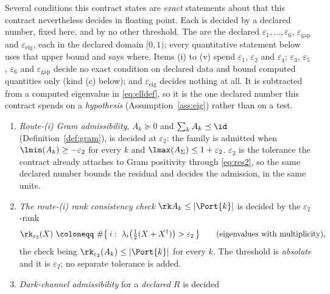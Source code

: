 \begin{definition}
\label{def:tolmap}
Several conditions this contract states are \emph{exact} statements about
 that this contract nevertheless decides in floating point. Each is decided by a declared number, fixed here,
and by no other threshold. The  are the declared
$\varepsilon_1,\dots,\varepsilon_6$, $\varepsilon_{\mathrm{gap}}$ and
$\varepsilon_{\mathrm{eig}}$, each in the declared domain $[0,1)$; every quantitative statement below uses
that upper bound and says where. Items (i) to (v) spend $\varepsilon_1$,
$\varepsilon_2$ and $\varepsilon_4$; $\varepsilon_3$, $\varepsilon_5$,
$\varepsilon_6$ and $\varepsilon_{\mathrm{gap}}$ decide no exact condition on
declared data and bound computed quantities only (kind (c) below); and
$\varepsilon_{\mathrm{eig}}$ decides nothing at all. It is subtracted from a
computed eigenvalue in \eqref{eq:elldef}, so it is the one declared number this
contract spends on a \emph{hypothesis} (Assumption~\ref{ass:eig}) rather than
on a test.
\begin{enumerate}[label=(\roman*),leftmargin=3.0em]
\item \emph{Route-(i) Gram admissibility}, $A_k\succeq0$ and
  $\sum_kA_k\preceq\id$ (Definition~\ref{def:gram}), is decided at
  $\varepsilon_2$: the family is admitted when $\lmin(A_k)\ge-\varepsilon_2$
  for every $k$ and $\lmax(A_\Sigma)\le1+\varepsilon_2$. $\varepsilon_2$ is the
  tolerance the contract already attaches to Gram positivity through
  \eqref{eq:res2}, so the same declared number bounds the residual and decides
  the admission, in the same units.
\item \emph{The route-(i) rank consistency check} $\rk A_k\le|\Port{k}|$ is
  decided by the $\varepsilon_2$-rank
  \begin{equation}\label{eq:eps2rank}
    \rk_{\varepsilon_2}(X)\ \coloneqq\
    \#\big\{\,i:\ \lambda_i\big(\tfrac12(X+X^\dagger)\big)>\varepsilon_2\,\big\}
    \qquad\text{(eigenvalues with multiplicity)},
  \end{equation}
  the check being $\rk_{\varepsilon_2}(A_k)\le|\Port{k}|$ for every $k$. The
  threshold is \emph{absolute} and it is $\varepsilon_2$; no separate tolerance
  is added.
\item \emph{Dark-channel admissibility} for a \emph{declared} $R$ is decided

\end{enumerate}
\end{definition}
